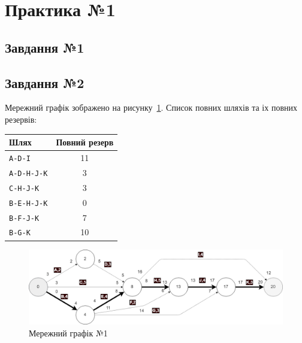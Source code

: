 





\lhead{\small \selectfont \khpistudentgroup}
\chead{\small \selectfont \khpistudentname}

\graphicspath{{figures/}}


\Ukrainian

\section*{Практика №1}
\subsection*{Завдання №1}
\subsection*{Завдання №2}
Мережний графік зображено на рисунку~\ref{fig:1_network}. Список повних шляхів та іх повних резервів:
\begin{table}[H]        
  \small
  \begin{tabular}{l|c}
    Шлях & Повний резерв \\ \hline
    \texttt{A-D-I} & 11 \\
    \texttt{A-D-H-J-K} & 3 \\
    \texttt{C-H-J-K} & 3 \\
    \texttt{B-E-H-J-K} & 0 \\
    \texttt{B-F-J-K} & 7 \\
    \texttt{B-G-K} & 10 \\
  \end{tabular}
\end{table}

\begin{figure}[h]
    \centering
        \includegraphics[width=\textwidth]{1_network}
    \caption{Мережний графік №1}
    \label{fig:1_network}
\end{figure}

\clearpage


